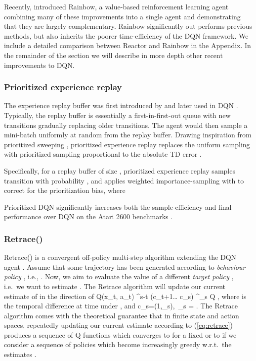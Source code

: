 \documentclass{article}
\newcommand{\beq}{}
\newcommand{\beqa}{}
\newcommand{\eqdef}{\stackrel{\rm def}{=}}
\begin{document}
Recently, \citet{rainbow} introduced Rainbow, a value-based 
reinforcement learning agent combining many of these improvements into a single 
agent and demonstrating that they are largely complementary. Rainbow significantly 
out performs previous methods, but also inherits the poorer time-efficiency of the DQN framework.
We include a detailed comparison between Reactor and Rainbow in the Appendix. 
In the remainder of the section we will describe in more depth other recent 
improvements to DQN.

\subsubsection{Prioritized experience replay}
The experience replay buffer was first introduced by \citet{lin1992self} and 
later used in DQN \citep{mnih15human}. Typically, the replay buffer is 
essentially a first-in-first-out queue with new transitions gradually replacing 
older transitions. The agent would then sample a mini-batch uniformly at random 
from the replay buffer. Drawing inspiration from prioritized sweeping 
\citep{moore1993prioritized}, prioritized experience replay replaces the uniform 
sampling with prioritized sampling proportional to the absolute TD error 
\citep{schaul16prioritized}.

Specifically, for a replay buffer of size , prioritized experience replay 
samples transition  with probability , and applies weighted 
importance-sampling with  to correct for the prioritization bias, where


Prioritized DQN significantly increases both the sample-efficiency and final 
performance over DQN on the Atari 2600 benchmarks \citep{schaul2015prioritized}.

\subsubsection{Retrace()}\label{sec:retrace}
Retrace() is a convergent off-policy multi-step algorithm extending the 
DQN agent \citep{munos2016safe}. Assume that some trajectory  has been generated according to {\em 
behaviour policy} , i.e., . Now, we aim to 
evaluate the value of a different {\em target policy} , i.e.~we want to 
estimate 
. The Retrace algorithm will update our current estimate  of 
 in the direction of
\beqa\label{eq:retrace}
\Delta Q(x_t, a_t)\eqdef {\textstyle \sum_{s\geq t}} \gamma^{s-t} (c_{t+1}\dots 
c_s) 
\delta^{\pi}_s Q ,
\eeqa
where  is the temporal difference at time  under , 
and 
\beq \label{eq:trace.cut}
c_s=\lambda\min\big(1,\rho_s\big),\ \quad \rho_s = 
.
\eeq 
The Retrace algorithm comes with the theoretical guarantee that in finite state 
and action spaces, repeatedly updating our current estimate  according to 
(\ref{eq:retrace}) produces a sequence of Q functions which converges to 
 for a fixed 
 or to  if we consider a sequence of policies  which become 
increasingly greedy w.r.t.~the  estimates \citep{munos2016safe}.
\end{document}
